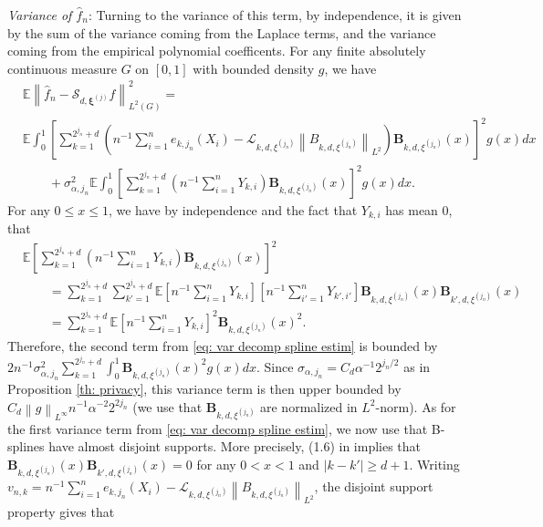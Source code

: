 \documentclass[preprint]{imsart}
\newcommand\norm[1]{\left\lVert#1\right\rVert}
\numberwithin{equation}{section}
\newcounter{cond}
\begin{document}
\begin{appendix}
\textit{Variance of $\hat{f}_n$}: Turning to the variance of this term, by independence, it is given by the sum of the variance coming from the Laplace terms, and the variance coming from the empirical polynomial coefficents. For any finite absolutely continuous measure $G$ on $[0,1]$ with bounded density $g$, we have
\begin{align} \label{eq: var decomp spline estim}
&\mathbb{E}\norm{\hat{f}_n-\mathcal{S}_{d,\mathbf{\xi}^{(j)}}f}_{L^2(G)}^2= \nonumber \\&\mathbb{E}\int_0^1 \left[\sum_{k=1}^{2^{j_n}+d} \left(n^{-1}\sum_{i=1}^n e_{k,j_n}(X_i)-\mathcal{L}_{k,d,\xi^{(j_n)}} \norm{B_{k,d,\xi^{(j_n)}}}_{L^2}\right)\mathbf{B}_{k,d,\xi^{(j_n)}}(x)\right]^2 g(x)dx\nonumber\\
&\qquad+\sigma_{\alpha,j_n}^2\mathbb{E}\int_0^1 \left[\sum_{k=1}^{2^{j_n}+d} \left(n^{-1}\sum_{i=1}^n Y_{k,i}\right) \mathbf{B}_{k,d,\xi^{(j_n)}}(x) \right]^2g(x) dx.
\end{align}
For any $0\leq x\leq1$, we have by independence and the fact that $Y_{k,i}$ has mean 0, that 
\begin{align*}
    &\mathbb{E}\left[\sum_{k=1}^{2^{j_n}+d} \left(n^{-1}\sum_{i=1}^n Y_{k,i}\right) \mathbf{B}_{k,d,\xi^{(j_n)}}(x) \right]^2 \\& \qquad= \sum_{k=1}^{2^{j_n}+d} \sum_{k'=1}^{2^{j_n}+d} \mathbb{E}\left[n^{-1}\sum_{i=1}^n Y_{k,i}\right]\left[n^{-1}\sum_{i'=1}^n Y_{k',i'}\right]  \mathbf{B}_{k,d,\xi^{(j_n)}}(x)\mathbf{B}_{k',d,\xi^{(j_n)}}(x)\\
    &\qquad= \sum_{k=1}^{2^{j_n}+d} \mathbb{E}\left[n^{-1}\sum_{i=1}^n Y_{k,i}\right]^2 \mathbf{B}_{k,d,\xi^{(j_n)}}(x)^2.
\end{align*}
Therefore, the second term from \eqref{eq: var decomp spline estim} is bounded by $2n^{-1}\sigma_{\alpha,j_n}^2\sum_{k=1}^{2^{j_n}+d} \int_0^1\mathbf{B}_{k,d,\xi^{(j_n)}}(x)^2 g(x)dx$. Since $\sigma_{\alpha,j_n}=C_d\alpha^{-1}2^{j_n/2}$ as in Proposition \ref{th: privacy}, this variance term is then upper bounded by $C_d \norm{g}_{L^\infty} n^{-1}\alpha^{-2} 2^{2j_n}$ (we use that $\mathbf{B}_{k,d,\xi^{(j_n)}}$ are normalized in $L^2$-norm). As for the first variance term from \eqref{eq: var decomp spline estim}, we now use that B-splines have almost disjoint supports. More precisely, (1.6) in \cite{LycheSpline} implies that 
$\mathbf{B}_{k,d,\xi^{(j_n)}}(x) \mathbf{B}_{k',d,\xi^{(j_n)}}(x) =0$
for any $0<x<1$ and $|k-k'|\geq d+1$. Writing $v_{n,k}=n^{-1}\sum_{i=1}^n e_{k,j_n}(X_i)-\mathcal{L}_{k,d,\xi^{(j_n)}}\norm{B_{k,d,\xi^{(j_n)}}}_{L^2}$, the disjoint support property gives that 

\end{appendix}
\end{document}
